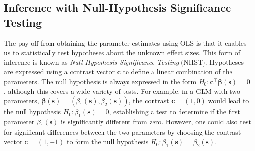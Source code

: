 \subsection{Inference with Null-Hypothesis Significance Testing}
\label{sec:NHST}
The pay off from obtaining the parameter estimates using OLS is that it enables us to statistically test hypotheses about the unknown effect sizes. This form of inference is known as \textit{Null-Hypothesis Significance Testing} (NHST). Hypotheses are expressed using a contrast vector $\bm{c}$ to define a linear combination of the parameters. The null hypothesis is always expressed in the form $H_{0} : \bm{c}^{\intercal}\bm{\beta}(\bm{s}) = 0$, although this covers a wide variety of tests. For example, in a GLM with two parameters, $\bm{\beta}(\bm{s}) = (\beta_{1}(\bm{s}), \beta_{2}(\bm{s}))$, the contrast $\bm{c} = (1, 0)$ would lead to the null hypothesis $H_{0} : \beta_{1}(\bm{s}) = 0$, establishing a test to determine if the first parameter $\beta_{1}(\bm{s})$ is significantly different from zero. However, one could also test for significant differences between the two parameters by choosing the contrast vector $\bm{c} = (1, -1)$ to form the null hypothesis $H_{0} : \beta_{1}(\bm{s}) = \beta_{2}(\bm{s})$. 

